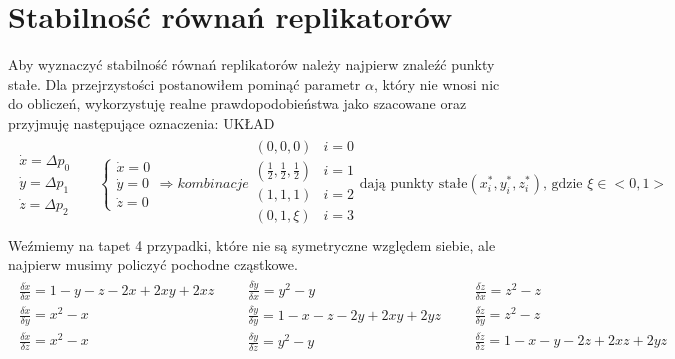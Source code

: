 \section{Stabilność równań replikatorów}
\label{sec:stab_repl}
Aby wyznaczyć stabilność równań replikatorów należy najpierw znaleźć punkty stałe. Dla przejrzystości postanowiłem pominąć parametr $\alpha$, który nie wnosi nic do obliczeń, wykorzystuję realne prawdopodobieństwa jako szacowane oraz przyjmuję następujące oznaczenia:
{\color{red} UKŁAD}
\begin{align*}
\begin{array}{l}
\dot{x} = \Delta p_0 \\
\dot{y} = \Delta p_1 \\
\dot{z} = \Delta p_2
\end{array}
&&
\left\{
\begin{array}{l}
\dot{x} = 0 \\
\dot{y} = 0 \\
\dot{z} = 0 
\end{array}
\right.
\Rightarrow kombinacje
\begin{array}{ll}
(0,0,0)  & i=0 \\
(\frac{1}{2},\frac{1}{2},\frac{1}{2}) & i=1 \\
(1,1,1) & i=2 \\
(0,1,\xi) & i=3 \\ 
\end{array}
\text{dają punkty stałe} (x^*_i, y^*_i, z^*_i)\text{, gdzie }\xi \in <0,1>
\end{align*}
Weźmiemy na tapet 4 przypadki, które nie są symetryczne względem siebie, ale najpierw musimy policzyć pochodne cząstkowe.
\begin{align*}
\begin{array}{l}
\frac{\delta \dot{x}}{\delta x} = 1-y-z-2x+2xy+2xz\\
\frac{\delta \dot{x}}{\delta y} = x^2 - x\\
\frac{\delta \dot{x}}{\delta z} = x^2 - x\\
\end{array}
&&
\begin{array}{l}
\frac{\delta \dot{y}}{\delta x} = y^2 - y\\
\frac{\delta \dot{y}}{\delta y} = 1-x-z-2y+2xy+2yz\\
\frac{\delta \dot{y}}{\delta z} = y^2 - y\\
\end{array}
&&
\begin{array}{l}
\frac{\delta \dot{z}}{\delta x} = z^2 - z\\
\frac{\delta \dot{z}}{\delta y} = z^2 - z\\
\frac{\delta \dot{z}}{\delta z} = 1-x-y-2z+2xz+2yz\\
\end{array}
\end{align*}
